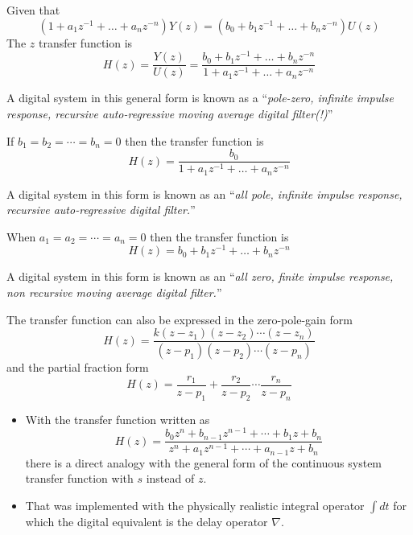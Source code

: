 \begin{slide}\label{slide:l9s1} 
Given that
\[(1 +
a_{1}z^{-1} + \ldots +  a_n z^{-n}) Y(z) = (b_0 + b_1 z^{-1} +
\ldots + b_n z^{-n}) U(z)\] The $z$ transfer function is
\[H(z) = \frac{Y(z)}{U(z)}=\frac{b_0 + b_{1}z^{-1} + \ldots + b_n
z^{-n}}{1 + a_1z^{-1} + \ldots + a_n z^{-n}}\]

A digital system in this general form is known as a
``\emph{pole-zero, infinite impulse response, recursive
auto-regressive moving average digital filter(!)}''
\end{slide}

\begin{slide}\label{slide:l9s2} 
If $b_1 = b_2 = \cdots = b_n = 0$ then the transfer function is
\[H(z) = \frac{b_0}{1 + a_1z^{-1} + \ldots + a_n z^{-n}}\]

A digital system in this form is known as an ``\emph{all pole,
infinite impulse response, recursive auto-regressive digital
filter.}''
\end{slide}

\begin{slide}\label{slide:l9s3} 
When $a_1 = a_2 = \cdots = a_n = 0$ then the transfer function is
\[H(z) = b_0 + b_{1}z^{-1} + \ldots + b_n
z^{-n}\]

A digital system in this form is known as an ``\emph{all zero,
finite impulse response, non recursive moving average digital
filter.}''
\end{slide}
\begin{slide}
The transfer function can also be expressed in the
zero-pole-gain form
\[H(z) = \frac{k(z-z_1)(z-z_2)\cdots(z-z_n)}{(z-p_1)(z-p_2)\cdots(z-p_n)}\]
and the partial fraction form
\[H(z) = \frac{r_1}{z-p_1}+\frac{r_2}{z-p_2}\cdots\frac{r_n}{z-p_n}\]
\end{slide}

\begin{slide}\label{slide:l9s4} 
\begin{itemize}
\item With the transfer function written as
\[H(z) = \frac{b_0 z^n + b_{n-1} z^{n-1} + \cdots + b_1 z + b_n}{z^n + a_1 z^{n-1} + \cdots + a_{n-1} z + b_n}\]
there is a direct analogy with the general form of the continuous
system transfer function with $s$ instead of $z$. \item That was
implemented with the physically realistic integral operator $\int
dt$ for which the digital equivalent is the delay operator
$\nabla$. 
\end{itemize}
\end{slide}

